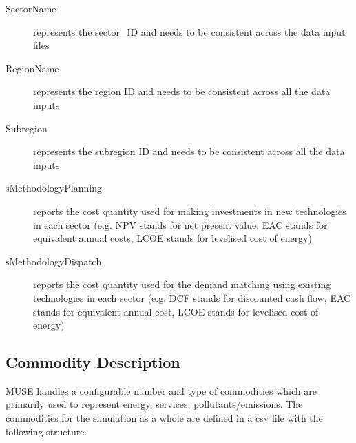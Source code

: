 \documentclass[letterpaper,10pt,english]{sphinxmanual}
\begin{document}
\begin{description}
\item[{SectorName}] \leavevmode
represents the sector\_ID and needs to be consistent across the data input files

\item[{RegionName}] \leavevmode
represents the region ID and needs to be consistent across all the data inputs

\item[{Subregion}] \leavevmode
represents the subregion ID and needs to be consistent across all the data inputs

\item[{sMethodologyPlanning}] \leavevmode
reports the cost quantity used for making investments in new technologies in each
sector (e.g. NPV stands for net present value, EAC stands for equivalent annual
costs, LCOE stands for levelised cost of energy)

\item[{sMethodologyDispatch}] \leavevmode
reports the cost quantity used for the demand matching using existing technologies in
each sector (e.g. DCF stands for discounted cash flow, EAC stands for equivalent
annual cost, LCOE stands for levelised cost of energy)

\end{description}


\subsection{Commodity Description}
\label{\detokenize{inputs/commodities:commodity-description}}\label{\detokenize{inputs/commodities:inputs-commodities}}\label{\detokenize{inputs/commodities::doc}}
MUSE handles a configurable number and type of commodities which are primarily used to
represent energy, services, pollutants/emissions. The commodities for the simulation as
a whole are defined in a csv file with the following structure.
\end{document}
